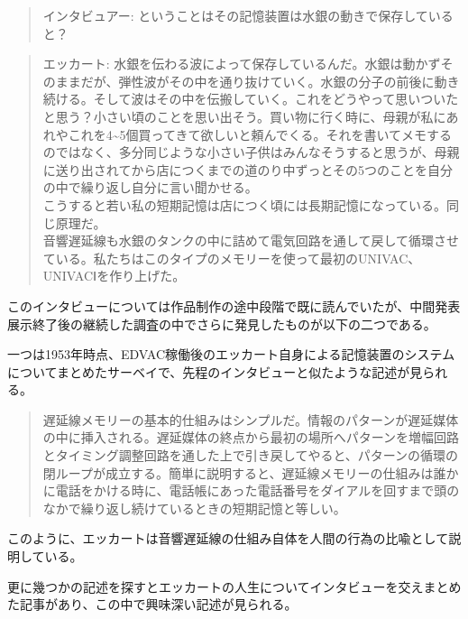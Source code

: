 \documentclass[a4paper,report]{jsbook}
\begin{document}
\begin{quote}
インタビュアー: ということはその記憶装置は水銀の動きで保存していると？
\end{quote}

\begin{quote}
エッカート:
水銀を伝わる波によって保存しているんだ。水銀は動かずそのままだが、弾性波がその中を通り抜けていく。水銀の分子の前後に動き続ける。そして波はその中を伝搬していく。これをどうやって思いついたと思う？小さい頃のことを思い出そう。買い物に行く時に、母親が私にあれやこれを4\textasciitilde{}5個買ってきて欲しいと頼んでくる。それを書いてメモするのではなく、多分同じような小さい子供はみんなそうすると思うが、母親に送り出されてから店につくまでの道のり中ずっとその5つのことを自分の中で繰り返し自分に言い聞かせる。\\
こうすると若い私の短期記憶は店につく頃には長期記憶になっている。同じ原理だ。\\
音響遅延線も水銀のタンクの中に詰めて電気回路を通して戻して循環させている。私たちはこのタイプのメモリーを使って最初のUNIVAC、UNIVACⅠを作り上げた。
\end{quote}

\autocite{eckertinterview}

このインタビューについては作品制作の途中段階で既に読んでいたが、中間発表展示終了後の継続した調査の中でさらに発見したものが以下の二つである。

一つは1953年時点、EDVAC稼働後のエッカート自身による記憶装置のシステムについてまとめたサーベイで、先程のインタビューと似たような記述が見られる。

\begin{quote}
遅延線メモリーの基本的仕組みはシンプルだ。情報のパターンが遅延媒体の中に挿入される。遅延媒体の終点から最初の場所へパターンを増幅回路とタイミング調整回路を通した上で引き戻してやると、パターンの循環の閉ループが成立する。簡単に説明すると、遅延線メモリーの仕組みは誰かに電話をかける時に、電話帳にあった電話番号をダイアルを回すまで頭のなかで繰り返し続けているときの短期記憶と等しい。
\end{quote}

\autocite{eckert1953survey}このように、エッカートは音響遅延線の仕組み自体を人間の行為の比喩として説明している。

更に幾つかの記述を探すとエッカートの人生についてインタビューを交えまとめた記事\autocite{eckstein1996j}があり、この中で興味深い記述が見られる。
\end{document}
